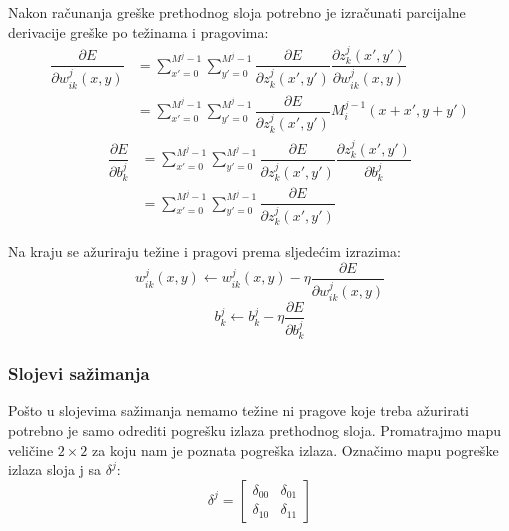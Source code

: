 \documentclass[times, utf8, zavrsni]{fer}
\begin{document}
Nakon računanja greške prethodnog sloja potrebno je izračunati parcijalne derivacije greške po težinama i pragovima:
\begin{equation}\label{eq:conv-sloj-derw}
\begin{split}
\dfrac{\partial E}{\partial w^j_{ik}(x, y)} &= \sum_{x'=0}^{M^j-1} \sum_{y'=0}^{M^j-1} \dfrac{\partial E}{\partial z^j_k (x', y')} \dfrac{\partial z^j_k (x', y')}{\partial w^j_{ik}(x, y)} \\
&= \sum_{x'=0}^{M^j-1} \sum_{y'=0}^{M^j-1} \dfrac{\partial E}{\partial z^j_k (x', y')} M^{j-1}_i (x+x', y+y')
\end{split}
\end{equation}
\begin{equation}\label{eq:conv-sloj-derb}
\begin{split}
\dfrac{\partial E}{\partial b^j_k} &= \sum_{x'=0}^{M^j-1} \sum_{y'=0}^{M^j-1} \dfrac{\partial E}{\partial z^j_k (x', y')} \dfrac{\partial z^j_k (x', y')}{\partial b^j_k} \\
&= \sum_{x'=0}^{M^j-1} \sum_{y'=0}^{M^j-1} \dfrac{\partial E}{\partial z^j_k (x', y')}
\end{split}
\end{equation}

Na kraju se ažuriraju težine i pragovi prema sljedećim izrazima:
\begin{equation}\label{eq:conv-azuriraj-w}
w^j_{ik}(x, y) \leftarrow w^j_{ik}(x, y) - \eta\dfrac{\partial E}{\partial w^j_{ik}(x, y)}
\end{equation}
\begin{equation}\label{eq:conv-azuriraj-b}
b^j_k \leftarrow b^j_k - \eta\dfrac{\partial E}{\partial b^j_k}
\end{equation}

\subsubsection{Slojevi sažimanja}
Pošto u slojevima sažimanja nemamo težine ni pragove koje treba ažurirati potrebno je samo odrediti pogrešku izlaza prethodnog sloja. Promatrajmo mapu veličine $2 \times 2$ za koju nam je poznata pogreška izlaza. Označimo mapu pogreške izlaza sloja j sa $\delta^j$:
\begin{equation}
\delta^j = \left[
\begin{matrix}
\delta_{00} & \delta_{01} \\
\delta_{10} & \delta_{11}
\end{matrix}
\right]
\end{equation}
\end{document}
